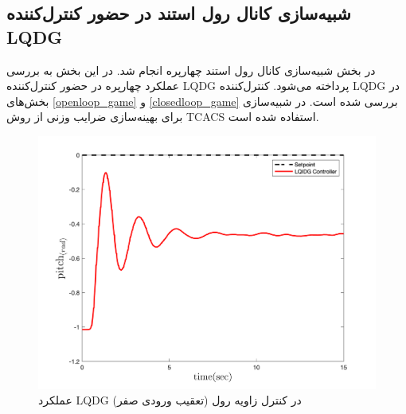 \subsection{شبیه‌سازی کانال رول استند در حضور کنترل‌کننده LQDG}
در بخش
\label{roll_LQDG}
شبیه‌سازی کانال رول استند چهارپره انجام شد. در این بخش به بررسی عملکرد چهارپره در حضور کنترل‌کننده LQDG پرداخته می‌شود. کنترل‌کننده LQDG در بخش‌های
\ref{openloop_game}
و
\ref{closedloop_game}
بررسی شده است.
 در شبیه‌سازی برای بهینه‌سازی ضرایب وزنی از روش
TCACS \cite{Karimi2010}
استفاده شده است.
\begin{figure}[H]
	\includegraphics[width=12cm]{../Figures/Calibration/LQDG/Pitch/lqdg_pitch.png}
	\centering
	\caption{عملكرد LQDG در کنترل زاويه رول (تعقیب ورودی صفر)}
\end{figure}


